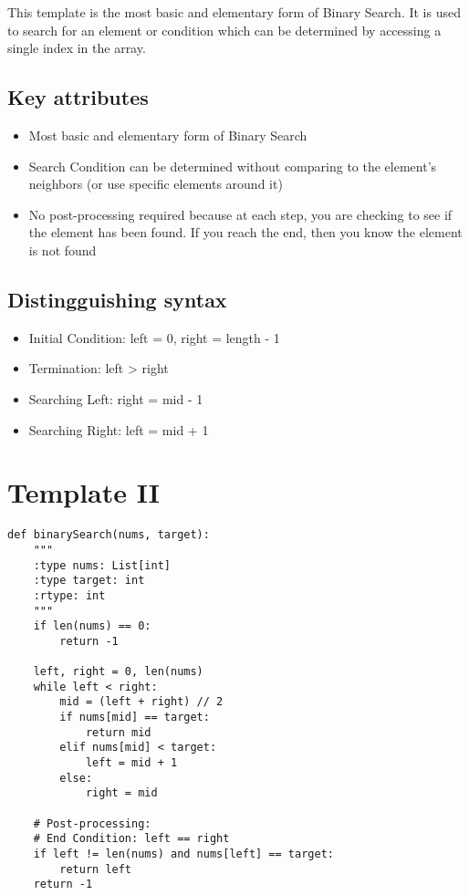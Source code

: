 This template is the most basic and elementary form of Binary Search. It is used to search for an element or condition which can be determined by accessing a single index in the array.




\subsection{Key attributes}

\begin{itemize}
\item Most basic and elementary form of Binary Search
\item Search Condition can be determined without comparing to the element's neighbors (or use specific elements around it)
\item No post-processing required because at each step, you are checking to see if the element has been found. If you reach the end, then you know the element is not found
\end{itemize}



\subsection{Distingguishing syntax}


\begin{itemize}
\item Initial Condition: left = 0, right = length - 1
\item Termination: left > right
\item Searching Left: right = mid - 1
\item Searching Right: left = mid + 1
\end{itemize}


\section{Template II}

\begin{lstlisting}
def binarySearch(nums, target):
    """
    :type nums: List[int]
    :type target: int
    :rtype: int
    """
    if len(nums) == 0:
        return -1

    left, right = 0, len(nums)
    while left < right:
        mid = (left + right) // 2
        if nums[mid] == target:
            return mid
        elif nums[mid] < target:
            left = mid + 1
        else:
            right = mid

    # Post-processing:
    # End Condition: left == right
    if left != len(nums) and nums[left] == target:
        return left
    return -1
\end{lstlisting}


